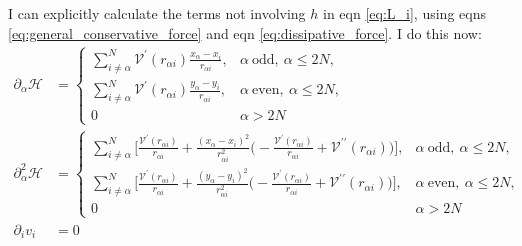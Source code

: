 \documentclass{article}
\begin{document}
I can explicitly calculate the terms not involving $h$ in eqn \ref{eq:L_i}, using eqns
\ref{eq:general_conservative_force} and eqn \ref{eq:dissipative_force}. I do this now:
\begin{subequations}
  \label{eqs:partials_of_L_i}
  \begin{align}
    \partial_{\alpha}\mathcal{H} &=
                                   \begin{cases}
                                     \sum_{i\neq\alpha}^N\mathcal{V}^{\prime}
                                     (r_{\alpha i})\frac{x_{\alpha}-x_i}{r_{\alpha i}},
                                     & \alpha\: \mathrm{odd},\:\alpha\leq2N,\\
                                     \sum_{i\neq\alpha}^N\mathcal{V}^{\prime}
                                     (r_{\alpha i})\frac{y_{\alpha}-y_i}{r_{\alpha i}},
                                     & \alpha\: \mathrm{even},\:\alpha\leq2N,\\
                                     0 & \alpha>2N
                                   \end{cases}\label{eq:partial_H_of_L_i}\\
    \partial_{\alpha}^2\mathcal{H} &=
                                     \begin{cases}
                                       \sum_{i\neq\alpha}^N\bigg[\frac{\mathcal{V}^{\prime}
                                         (r_{\alpha i})}{r_{\alpha i}}
                                       +\frac{(x_{\alpha}-x_i)^2}{r_{\alpha i}^2}
                                       \bigg(-\frac{\mathcal{V}^{\prime}(r_{\alpha i})}
                                       {r_{\alpha i}}+\mathcal{V}^{\prime\prime}
                                       (r_{\alpha i})\bigg)\bigg],
                                       & \alpha\: \mathrm{odd},\:\alpha\leq2N,\\
                                       \sum_{i\neq\alpha}^N\bigg[\frac{\mathcal{V}^{\prime}
                                         (r_{\alpha i})}{r_{\alpha i}}
                                       +\frac{(y_{\alpha}-y_i)^2}{r_{\alpha i}^2}
                                       \bigg(-\frac{\mathcal{V}^{\prime}(r_{\alpha i})}
                                       {r_{\alpha i}}+\mathcal{V}^{\prime\prime}
                                       (r_{\alpha i})\bigg)\bigg],
                                       & \alpha\: \mathrm{even},\:\alpha\leq2N,\\
                                       0 & \alpha>2N
                                     \end{cases}\label{eq:partialsq_H_of_L_i}\\
    \partial_i v_i &= 0\label{eq:partial_v_of_L_i}
  \end{align}
\end{subequations}
\end{document}
